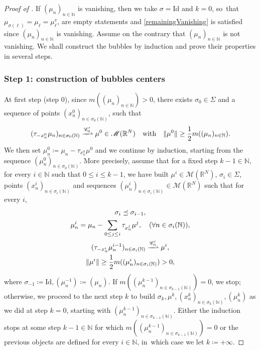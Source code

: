 \documentclass[11pt]{article}
\theoremstyle{plain}
\theoremstyle{definition}
\newcommand{\N}{\mathbb{N}}
\newcommand{\R}{\mathbb{R}}
\newcommand{\Cspace}{\mathscr{C}}
\newcommand{\Mspace}{\mathscr{M}}
\newcommand{\id}{\mathrm{Id}}
\DeclarePairedDelimiter{\norm}{\lVert}{\rVert}
\newcommand{\mweakto}{\xrightharpoonup{\Cspace_0'}}
\numberwithin{equation}{section}
\begin{document}
\begin{proof}[Proof of ]
If \((\mu_n)_{n\in\N}\) is vanishing, then we take $\sigma = \id$ and $k=0$, so~that $\mu_{\sigma(\ell)} = \mu_\ell = \mu^v_\ell$,  are empty statements and \ref{remainingVanishing} is satisfied since $(\mu_n)_{n\in\N}$ is vanishing. Assume on the contrary that \((\mu_n)_{n\in\N}\) is not vanishing. We shall construct the bubbles by induction and prove their properties in several steps.

\subsubsection*{Step 1: construction of bubbles centers} At first step (step $0$), since \(m((\mu_n)_{n\in\N})>0\), there exists $\sigma_0 \in \Sigma$ and a sequence of points \((x^0_{n})_{n \in \sigma_0(\N)}\), such that
\begin{equation}
(\tau_{-x^0_{n}} \mu_n)_{n \in \sigma_0(\N)}\mweakto\mu^0\in\Mspace(\R^N)\quad\text{with}\quad\norm{\mu^0} \geq \frac 12 m((\mu_n)_{n\in\N}).
\end{equation}
We then set \(\mu^0_n\coloneqq\mu_n-\tau_{x^0_n}\mu^0\) and we continue by induction, starting from the sequence \((\mu^0_n)_{n\in\sigma_0(\N)}\). More precisely, assume that for a fixed step $k-1 \in \N$, for every \(i\in\N\) such that \(0\le i\le k-1\), we have built $\mu^i \in \Mspace(\R^N)$, $\sigma_i \in \Sigma$, points $(x^i_n)_{n\in \sigma_i(\N)}$ and sequences $(\mu^i_{n})_{n\in \sigma_i(\N)} \in \Mspace(\R^N)$ such that for every $i$,
\begin{gather}
\sigma_i \preceq \sigma_{i-1},\label{bubbleInduction1}\\
\mu^i_{n} = \mu_n -\sum_{0\leq j \leq i} \tau_{x^j_n}\mu^j, \quad (\forall n \in \sigma_i(\N)),\label{bubbleInduction2}\\
(\tau_{-x^i_n} \mu^{i-1}_n)_{n\in\sigma_i(\N)} \mweakto \mu^i,\label{bubbleInduction3}\\
\norm{\mu^i} \geq \frac 12 m((\mu^i_n)_{n \in\sigma_i(\N)})>0,\label{bubbleInduction4}
\end{gather}
where $\sigma_{-1} \coloneqq \id, (\mu_n^{-1}) \coloneqq (\mu_n)$. If $m((\mu^{k-1}_n)_{n\in \sigma_{k-1}(\N)}) = 0$, we stop; otherwise, we proceed to the next step $k$ to build $\sigma_k, \mu^k, (x_n^k)_{n\in\sigma_k(\N)}, (\mu_n^k)$ as we did at step $k=0$, starting with $(\mu^{k-1}_n)_{n\in\sigma_{k-1}(\N)}$. Either the induction stops at some step \(k-1\in\N\) for which \(m((\mu^{k-1}_{n})_{n\in \sigma_{k-1}(\N)})=0\) or the previous objects are defined for every \(i\in\N\), in~which case we let \(k \coloneqq +\infty\).


\end{proof}
\end{document}
